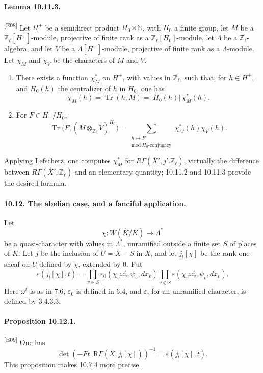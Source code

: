 \documentclass[10pt,letterpaper]{article}
\newcommand{\Z}{\mathbb Z}
\newcommand{\Tr}{\operatorname{Tr}}
\providecommand{\Tr}{\operatorname{Tr}}
\providecommand{\Tr}{\operatorname{Tr}}
\providecommand{\RGamma}{\mathrm R\Gamma}
\providecommand{\Tr}{\operatorname{Tr}}
\newcommand{\auditmark}[1]{\textsuperscript{\normalfont\scriptsize[E#1]}}
\begin{document}
\paragraph{Lemma 10.11.3.}\auditmark{08} Let \(H^+\) be a semidirect product \(H_0\rtimes\mathbb N\), with \(H_0\) a finite group, let \(M\) be a \(\Z_\ell[H^+]\)-module, projective of finite rank as a \(\Z_\ell[H_0]\)-module, let \(\Lambda\) be a \(\Z_\ell\)-algebra, and let \(V\) be a \(\Lambda[H^+]\)-module, projective of finite rank as a \(\Lambda\)-module. Let \(\chi_M\) and \(\chi_V\) be the characters of \(M\) and \(V\).
\begin{enumerate}[label=(\roman*)]
\item There exists a function \(\chi_M^*\) on \(H^+\), with values in \(\Z_\ell\), such that, for \(h\in H^+\), and \(H_0(h)\) the centralizer of \(h\) in \(H_0\), one has
\[
\chi_M(h)=\Tr(h,M)=|H_0(h)|\,\chi_M^*(h).
\]
\item For \(F\in H^+/H_0\),
\[
\Tr\bigl(F,(M\otimes_{\Z_\ell}V)^{H_0}\bigr)
=
\sum_{\substack{h\mapsto F\\ \mathrm{mod}\ H_0\text{-conjugacy}}}
\chi_M^*(h)\chi_V(h).
\]
\end{enumerate}

Applying Lefschetz, one computes \(\chi_M^*\) for \(R\Gamma(\overline X',j'_!\Z_\ell)\), virtually the difference between \(R\Gamma(\overline X',\Z_\ell)\) and an elementary quantity; 10.11.2 and 10.11.3 provide the desired formula.





\paragraph{10.12. The abelian case, and a fanciful application.} Let
\[
\chi:W(\overline K/K)\longrightarrow \Lambda^*
\]
be a quasi-character with values in \(\Lambda^*\), unramified outside a finite set \(S\) of places of \(K\). Let \(j\) be the inclusion of \(U=X-S\) in \(X\), and let \(j_![\chi]\) be the rank-one sheaf on \(U\) defined by \(\chi\), extended by \(0\). Put
\[
\varepsilon(j_![\chi],t)=
\prod_{v\in S}\varepsilon_0(\chi_v\omega_v^t,\psi_v,dx_v)
\prod_{v\notin S}\varepsilon(\chi_v\omega_v^t,\psi_v,dx_v).
\]
Here \(\omega^t\) is as in 7.6, \(\varepsilon_0\) is defined in 6.4, and \(\varepsilon\), for an unramified character, is defined by 3.4.3.3.

\paragraph{Proposition 10.12.1.}\auditmark{09} One has
\[
\det(-Ft,\RGamma(\overline X,j_![\chi]))^{-1}=\varepsilon(j_![\chi],t).
\]
This proposition makes 10.7.4 more precise.
\end{document}
